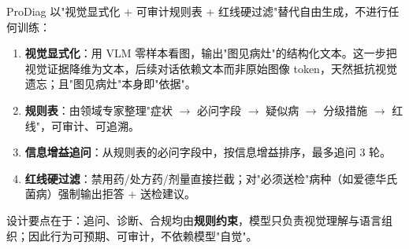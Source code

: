 ProDiag 以"视觉显式化 + 可审计规则表 + 红线硬过滤"替代自由生成，不进行任何训练：

\begin{enumerate}
    \item \textbf{视觉显式化}：用 VLM 零样本看图，输出"图见病灶"的结构化文本。这一步把视觉证据降维为文本，后续对话依赖文本而非原始图像 token，天然抵抗视觉遗忘；且"图见病灶"本身即"依据"。
    \item \textbf{规则表}：由领域专家整理"症状 $\rightarrow$ 必问字段 $\rightarrow$ 疑似病 $\rightarrow$ 分级措施 $\rightarrow$ 红线"，可审计、可追溯。
    \item \textbf{信息增益追问}：从规则表的必问字段中，按信息增益排序，最多追问 3 轮。
    \item \textbf{红线硬过滤}：禁用药/处方药/剂量直接拦截；对"必须送检"病种（如爱德华氏菌病）强制输出拒答 + 送检建议。
\end{enumerate}

设计要点在于：追问、诊断、合规均由\textbf{规则约束}，模型只负责视觉理解与语言组织；因此行为可预期、可审计，不依赖模型"自觉"。
